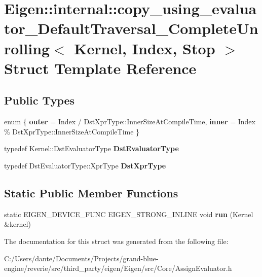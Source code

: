 \hypertarget{struct_eigen_1_1internal_1_1copy__using__evaluator___default_traversal___complete_unrolling}{}\section{Eigen\+::internal\+::copy\+\_\+using\+\_\+evaluator\+\_\+\+Default\+Traversal\+\_\+\+Complete\+Unrolling$<$ Kernel, Index, Stop $>$ Struct Template Reference}
\label{struct_eigen_1_1internal_1_1copy__using__evaluator___default_traversal___complete_unrolling}
\subsection*{Public Types}
\begin{DoxyCompactItemize}
\item 
\mbox{\label{struct_eigen_1_1internal_1_1copy__using__evaluator___default_traversal___complete_unrolling_aaaf0edd32ac2b66d35b8b4b74ef69ba1}} 
enum \{ {\bfseries outer} = Index / Dst\+Xpr\+Type\+::Inner\+Size\+At\+Compile\+Time, 
{\bfseries inner} = Index \% Dst\+Xpr\+Type\+::Inner\+Size\+At\+Compile\+Time
 \}
\item 
\mbox{\label{struct_eigen_1_1internal_1_1copy__using__evaluator___default_traversal___complete_unrolling_afa8b115419f4f7254c00e31026d89ad6}} 
typedef Kernel\+::\+Dst\+Evaluator\+Type {\bfseries Dst\+Evaluator\+Type}
\item 
\mbox{\label{struct_eigen_1_1internal_1_1copy__using__evaluator___default_traversal___complete_unrolling_a26932dba1235922ba07998e8b6afd88e}} 
typedef Dst\+Evaluator\+Type\+::\+Xpr\+Type {\bfseries Dst\+Xpr\+Type}
\end{DoxyCompactItemize}
\subsection*{Static Public Member Functions}
\begin{DoxyCompactItemize}
\item 
\mbox{\label{struct_eigen_1_1internal_1_1copy__using__evaluator___default_traversal___complete_unrolling_a9d9964d1daebdb781f198dc25cde8d1f}} 
static E\+I\+G\+E\+N\+\_\+\+D\+E\+V\+I\+C\+E\+\_\+\+F\+U\+NC E\+I\+G\+E\+N\+\_\+\+S\+T\+R\+O\+N\+G\+\_\+\+I\+N\+L\+I\+NE void {\bfseries run} (Kernel \&kernel)
\end{DoxyCompactItemize}


The documentation for this struct was generated from the following file\+:\begin{DoxyCompactItemize}
\item 
C\+:/\+Users/dante/\+Documents/\+Projects/grand-\/blue-\/engine/reverie/src/third\+\_\+party/eigen/\+Eigen/src/\+Core/Assign\+Evaluator.\+h\end{DoxyCompactItemize}
